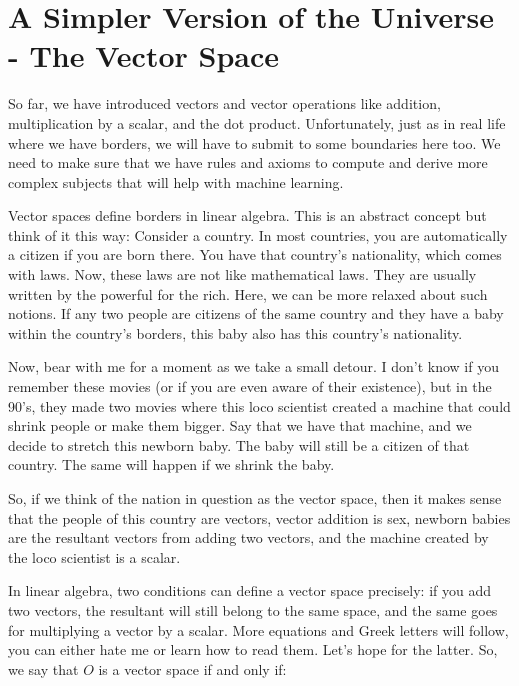 \documentclass[600paper, 11pt,twoside,openany]{kdp}
\begin{document}
\section{A Simpler Version of the Universe - The Vector Space}
\par 
\vspace{-3pt}
\indent So far, we have introduced vectors and vector operations like addition, multiplication by a scalar, and the dot product. Unfortunately, just as in real life where we have borders, we will have to submit to some boundaries here too. We need to make sure that we have rules and axioms to compute and derive more complex subjects that will help with machine learning.
\par 
\vspace{-3pt}
\indent Vector spaces define borders in linear algebra. This is an abstract concept but think of it this way: Consider a country. In most countries, you are automatically a citizen if you are born there. You have that country’s nationality, which comes with laws. Now, these laws are not like mathematical laws. They are usually written by the powerful for the rich. Here, we can be more relaxed about such notions. If any two people are citizens of the same country and they have a baby within the country’s borders, this baby also has this country’s nationality.
\par 
\vspace{-3pt}
\indent Now, bear with me for a moment as we take a small detour. I don’t know if you remember these movies (or if you are even aware of their existence), but in the 90's, they made two movies where this loco scientist created a machine that could shrink people or make them bigger. Say that we have that machine, and we decide to stretch this newborn baby. The baby will still be a citizen of that country. The same will happen if we shrink the baby.
\par 
\vspace{-3pt}
\indent So, if we think of the nation in question as the vector space, then it makes sense that the people of this country are vectors, vector addition is sex, newborn babies are the resultant vectors from adding two vectors, and the machine created by the loco scientist is a scalar.
\par 
\vspace{-3pt}
\indent In linear algebra, two conditions can define a vector space precisely: if you add two vectors, the resultant will still belong to the same space, and the same goes for multiplying a vector by a scalar. More equations and Greek letters will follow, you can either hate me or learn how to read them. Let’s hope for the latter. So, we say that $O$ is a vector space if and only if:
\end{document}
